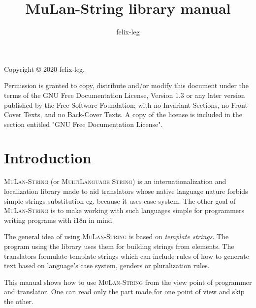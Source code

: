 \documentclass[a4paper]{article}
\title{MuLan-String library manual}
\author{felix-leg}
\def\mulan{\textsc{MuLan-String}}
\begin{document}
\maketitle
\vfill
    Copyright © 2020  felix-leg. \par
    Permission is granted to copy, distribute and/or modify this document
    under the terms of the GNU Free Documentation License, Version 1.3
    or any later version published by the Free Software Foundation;
    with no Invariant Sections, no Front-Cover Texts, and no Back-Cover Texts.
    A copy of the license is included in the section entitled "GNU
    Free Documentation License".
\pagebreak
\tableofcontents

\pagebreak

\section{Introduction}

\mulan{} (or \textsc{MultiLanguage String}) is an internationalization and localization library made to aid translators whose native language nature forbids simple strings substitution eg. because it uses case system.
The other goal of \mulan{} is to make working with such languages simple for programmers writing programs with i18n in mind. 

The general idea of using \mulan{} is based on \emph{template strings}. The program using the library uses them for building strings from elements. 
The translators formulate template strings which can include rules of how to generate text based on language's case system, genders or pluralization rules.

This manual shows how to use \mulan{} from the view point of programmer and translator. One can read only the part made for one point of view and skip the other. 






\pagebreak
\appendix

\end{document}
